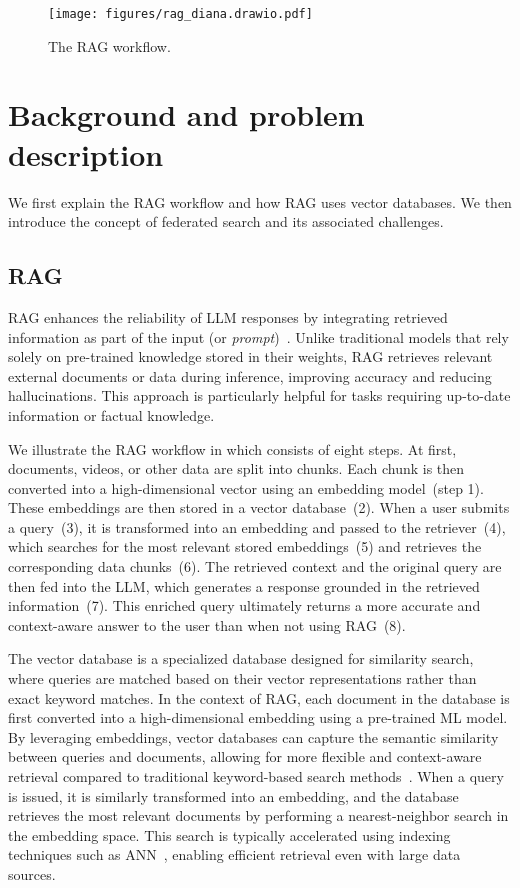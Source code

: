 \begin{figure}
    \centering
    \texttt{[image: figures/rag\_diana.drawio.pdf]}
    \caption{The \ac{RAG} workflow.}
    \label{fig:rag}
\end{figure}


\section{Background and problem description}
\label{sec:prelims}
We first explain the \ac{RAG} workflow and how \ac{RAG} uses vector databases.
We then introduce the concept of federated search and its associated challenges.

\subsection{\Acf{RAG}}
\ac{RAG} enhances the reliability of \ac{LLM} responses by integrating retrieved information as part of the input (or \emph{prompt})~\cite{lewis2020retrieval}.
Unlike traditional models that rely solely on pre-trained knowledge stored in their weights, \ac{RAG} retrieves relevant external documents or data during inference, improving accuracy and reducing hallucinations.
This approach is particularly helpful for tasks requiring up-to-date information or factual knowledge.

We illustrate the \ac{RAG} workflow in  which consists of eight steps.
At first, documents, videos, or other data are split into chunks. Each chunk is then converted into a high-dimensional vector using an embedding model~(step 1).
These embeddings are then stored in a vector database~(2).
When a user submits a query~(3), it is transformed into an embedding and passed to the retriever~(4), which searches for the most relevant stored embeddings~(5) and retrieves the corresponding data chunks~(6).
The retrieved context and the original query are then fed into the \ac{LLM}, which generates a response grounded in the retrieved information~(7).
This enriched query ultimately returns a more accurate and context-aware answer to the user than when not using \ac{RAG}~(8).

The vector database is a specialized database designed for similarity search, where queries are matched based on their vector representations rather than exact keyword matches.
In the context of \ac{RAG}, each document in the database is first converted into a high-dimensional embedding using a pre-trained \ac{ML} model.
By leveraging embeddings, vector databases can capture the semantic similarity between queries and documents, allowing for more flexible and context-aware retrieval compared to traditional keyword-based search methods~\cite{han2023comprehensive}.
When a query is issued, it is similarly transformed into an embedding, and the database retrieves the most relevant documents by performing a nearest-neighbor search in the embedding space.
This search is typically accelerated using indexing techniques such as \ac{ANN}~\cite{li2019approximate}, enabling efficient retrieval even with large data sources.


